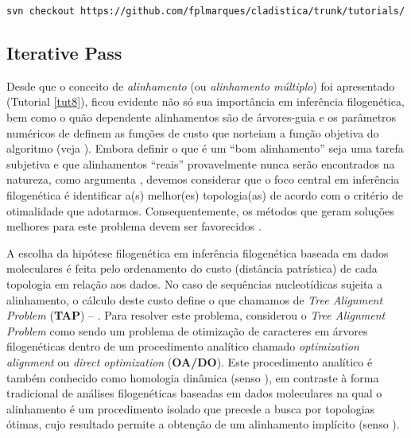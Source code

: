 \begin{center}
\small \texttt{svn checkout https://github.com/fplmarques/cladistica/trunk/tutorials/}\\
\end{center}



\newpage
\pagestyle{fancy} %
\begin{refsection}
\renewcommand*{\finalnamedelim}{\addspace\&\space} %
%
\newcommand{\A}{\textcolor{green}{\textbf{A}}}
\newcommand{\C}{\textcolor{blue}{\textbf{C}}}
\newcommand{\G}{\textcolor{gray}{\textbf{G}}}
\newcommand{\T}{\textcolor{red}{\textbf{T}}}
\newcommand{\gap}{\textcolor{black}{\textbf{-}}}


\section{Iterative Pass}\label{tut11:ip}
	
Desde que o conceito de \textit{alinhamento} (ou \textit{alinhamento múltiplo}) foi apresentado (Tutorial \ref{tut8}), ficou evidente não só sua importância em inferência filogenética, bem como o quão dependente alinhamentos são de árvores-guia e os parâmetros numéricos de definem as funções de custo que norteiam a função objetiva do algoritmo (veja \textcite{Phillips_et_al_2000,Giribet_at_al_2002}). Embora definir o que é um ``bom alinhamento'' seja uma tarefa subjetiva e que alinhamentos ``reais'' provavelmente nunca serão encontrados na natureza, como argumenta \textcite{Wheeler_2012}, devemos considerar que o foco central em inferência filogenética é identificar a(s) melhor(es) topologia(as) de acordo com o critério de otimalidade que adotarmos. Consequentemente, os métodos que geram soluções melhores para este problema devem ser favorecidos \parencite[][]{Wheeler_and_Giribet_2009}.

A escolha da hipótese filogenética em inferência filogenética baseada em dados moleculares é feita pelo ordenamento do custo (distância patrística) de cada topologia em relação aos dados. No caso de sequências nucleotídicas sujeita a alinhamento, o cálculo deste custo define o que chamamos de \textit{Tree Alignment Problem} (\textbf{TAP}) -- \parencite[][]{Sankoff_1975}. Para resolver este problema, \textcite{Wheeler_1996} considerou o \textit{Tree Alignment Problem} como sendo um problema de otimização de caracteres em árvores filogenéticas dentro de um procedimento analítico chamado \textit{optimization alignment} ou \textit{direct optimization} (\textbf{OA/DO}). Este procedimento analítico é também conhecido como homologia dinâmica (senso \textcite{Wheeler_2001}), em contraste à forma tradicional de análises filogenéticas baseadas em dados moleculares na qual o alinhamento é um procedimento isolado que precede a busca por topologias ótimas, cujo resultado permite a obtenção de um alinhamento implícito (senso \textcite{Wheeler_2003a}).


\end{refsection}
